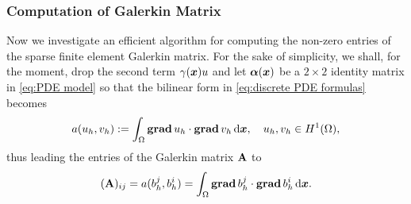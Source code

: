 	\subsubsection{Computation of Galerkin Matrix}\label{subsubsection.2.2.3}
	Now we investigate an efficient algorithm for computing the non-zero 
	entries of the sparse finite element Galerkin matrix. For the sake of 
	simplicity, we shall, for the moment, drop the second term $\gamma(\bm{x})u$ 
	and let $\bm{\alpha}(\bm{x})$ be a $2\times2$ identity matrix in 
	\eqref{eq:PDE model} so that the bilinear form in
	\eqref{eq:discrete PDE formulas} becomes
	\[a(u_h,v_h):=\int_{\Omega}\mathbf{grad}\, u_h\cdot\mathbf{grad}\, v_h\,\mathrm{d}\bm{x},
		\quad u_h,v_h\in H^1(\Omega), \]
	thus leading the entries of the Galerkin matrix $\mathbf{A}$ to
	\[(\mathbf{A})_{ij}=a(b_h^j,b_h^i)=
	\int_{\Omega}\mathbf{grad}\, b_h^j\cdot\mathbf{grad}\, b_h^i\, \mathrm{d}\bm{x}.\]
	
